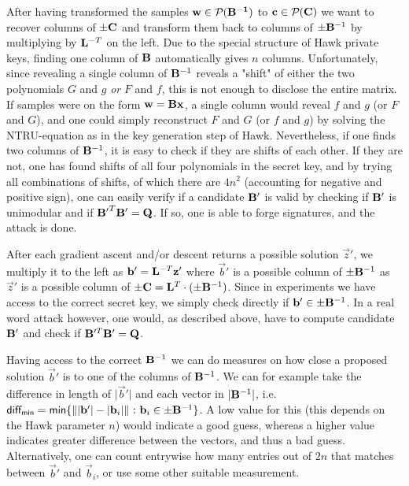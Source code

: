 {{After having transformed the samples $\mathbf{w} \in \mathcal{P}_{}(\mathbf{\mathbf{B}^{-1}})$ to $\mathbf{c} \in \mathcal{P}_{}(\mathbf{\mathbf{C}})$ we want to recover columns of $\pm \mathbf{C}$ and transform them back to columns of $\pm \mathbf{B}^{-1}$ by multiplying by $\mathbf{L}^{-T}$ on the left.
Due to the special structure of Hawk private keys, finding one column of $\mathbf{B}$ automatically gives $n$ columns.
Unfortunately, since revealing a single column of $ \mathbf{B}^{-1}$ reveals a "shift" of either the two polynomials $G$ and $ g$ \textit{or} $F$ and $f$,
this is not enough to disclose the entire matrix. If samples were on the form $\mathbf{w} = \mathbf{B} \mathbf{x}$, a single column would reveal $f$ and $g$ (or $F$ and $G$), and one could simply reconstruct $F$ and $G$ (or $f$ and $g$)
by solving the NTRU-equation as in the key generation step of Hawk.
Nevertheless, if one finds two columns of $\mathbf{B}^{-1}$, it is easy to check if they are shifts of each other. If they are not, one has found shifts of all four polynomials in the secret key, 
and by trying all combinations of shifts, of which there are $4 n^2$ (accounting for negative and positive sign), one can easily verify if a candidate $\mathbf{B'}$ is valid by 
checking if $\mathbf{B}'$ is unimodular and if $\mathbf{B'}^T \mathbf{B'} = \mathbf{Q}$. If so, one is able to forge signatures, and the attack is done.

After each gradient ascent and/or descent returns a possible solution $\vec{z}'$, 
we multiply it to the left as $\mathbf{b}' = \mathbf{L}^{-T} \mathbf{z}'$ where $\vec{b}'$ is a possible column of $\pm \mathbf{B}^{-1}$ as $\vec{z}'$ is a possible column of $\pm \mathbf{C} = \mathbf{L}^T \cdot (\pm \mathbf{B}^{-1})$.
Since in experiments we have access to the correct secret key, we simply check directly if $\mathbf{b}' \in \pm \mathbf{B}^{-1}$.
In a real word attack however, one would, as described above, have to compute candidate $\mathbf{B}'$ and check if $\mathbf{B}'^T\mathbf{B}' = \mathbf{Q}$.

Having access to the correct $\mathbf{B}^{-1}$ we can do measures on how close a proposed solution $\vec{b}'$ is to one of the columns of $\mathbf{B}^{-1}$.
We can for example take the difference in length of $\lvert \vec{b}' \rvert $ and each vector in $\lvert \mathbf{B}^{-1}\rvert$, i.e. 
$ \mathsf{diff_{min}} = \mathsf{min} \{\lVert \lvert \vec{b}' \rvert - \lvert \vec{b}_i \rvert \rVert \ \mathbf{:} \ \vec{b}_i \in \pm \mat{B}^{-1}\}$.
A low value for this (this depends on the Hawk parameter $n$) would indicate a good guess, whereas a higher value indicates greater difference between the vectors, and thus a bad guess.
Alternatively, one can count entrywise how many entries out of $2n$ that matches between $\vec{b}'$ and $\vec{b}_i$, or use some other suitable measurement.

}}
